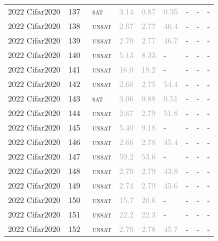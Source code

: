 \begin{center}
{\begin{longtable}{@{}lllllllll@{}}
2022 Cifar2020 & 137 & ~\textsc{sat} & \textcolor{darkgray}{3.14} & \textcolor{darkgray}{0.87} & \textcolor{darkgray}{0.35} & - & - & - \\
2022 Cifar2020 & 138 & ~\textsc{unsat} & \textcolor{darkgray}{2.67} & \textcolor{darkgray}{2.77} & \textcolor{darkgray}{46.4} & - & - & - \\
2022 Cifar2020 & 139 & ~\textsc{unsat} & \textcolor{darkgray}{2.70} & \textcolor{darkgray}{2.77} & \textcolor{darkgray}{46.7} & - & - & - \\
2022 Cifar2020 & 140 & ~\textsc{unsat} & \textcolor{darkgray}{5.13} & \textcolor{darkgray}{8.33} & - & - & - & - \\
2022 Cifar2020 & 141 & ~\textsc{unsat} & \textcolor{darkgray}{16.0} & \textcolor{darkgray}{18.2} & - & - & - & - \\
2022 Cifar2020 & 142 & ~\textsc{unsat} & \textcolor{darkgray}{2.68} & \textcolor{darkgray}{2.75} & \textcolor{darkgray}{54.4} & - & - & - \\
2022 Cifar2020 & 143 & ~\textsc{sat} & \textcolor{darkgray}{3.06} & \textcolor{darkgray}{0.88} & \textcolor{darkgray}{0.51} & - & - & - \\
2022 Cifar2020 & 144 & ~\textsc{unsat} & \textcolor{darkgray}{2.67} & \textcolor{darkgray}{2.79} & \textcolor{darkgray}{51.8} & - & - & - \\
2022 Cifar2020 & 145 & ~\textsc{unsat} & \textcolor{darkgray}{5.40} & \textcolor{darkgray}{9.18} & - & - & - & - \\
2022 Cifar2020 & 146 & ~\textsc{unsat} & \textcolor{darkgray}{2.66} & \textcolor{darkgray}{2.78} & \textcolor{darkgray}{45.4} & - & - & - \\
2022 Cifar2020 & 147 & ~\textsc{unsat} & \textcolor{darkgray}{59.2} & \textcolor{darkgray}{53.6} & - & - & - & - \\
2022 Cifar2020 & 148 & ~\textsc{unsat} & \textcolor{darkgray}{2.70} & \textcolor{darkgray}{2.79} & \textcolor{darkgray}{43.8} & - & - & - \\
2022 Cifar2020 & 149 & ~\textsc{unsat} & \textcolor{darkgray}{2.74} & \textcolor{darkgray}{2.79} & \textcolor{darkgray}{45.6} & - & - & - \\
2022 Cifar2020 & 150 & ~\textsc{unsat} & \textcolor{darkgray}{15.7} & \textcolor{darkgray}{20.6} & - & - & - & - \\
2022 Cifar2020 & 151 & ~\textsc{unsat} & \textcolor{darkgray}{22.2} & \textcolor{darkgray}{22.3} & - & - & - & - \\
2022 Cifar2020 & 152 & ~\textsc{unsat} & \textcolor{darkgray}{2.70} & \textcolor{darkgray}{2.78} & \textcolor{darkgray}{45.7} & - & - & - \\

\end{longtable}}
\end{center}

